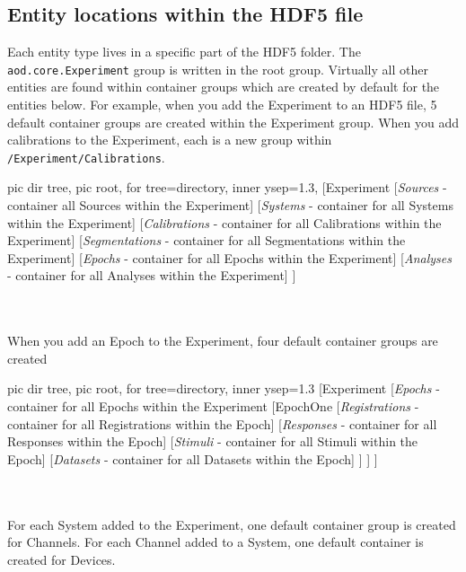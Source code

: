 \documentclass[10pt]{exam}
\newcommand\aodclass[1]{\textcolor{codeblue}{\texttt{#1}}}
\begin{document}
	\subsection{Entity locations within the HDF5 file}
		\label{subsection:EntityLocationsInHDF5}
		\noindent Each entity type lives in a specific part of the HDF5 folder. The \aodclass{aod.core.Experiment} group is written in the root group. Virtually all other entities are found within container groups which are created by default for the entities below. For example, when you add the Experiment to an HDF5 file, 5 default container groups are created within the Experiment group. When you add calibrations to the Experiment, each is a new group within \texttt{/Experiment/Calibrations}. \\
		
		\begin{forest}
			pic dir tree,
			pic root,
			for tree={directory, inner ysep=1.3},
			[Experiment
				[\textit{Sources} - container all Sources within the Experiment]
				[\textit{Systems} - container for all Systems within the Experiment]
				[\textit{Calibrations} - container for all Calibrations within the Experiment]
				[\textit{Segmentations} - container for all Segmentations within the Experiment]
				[\textit{Epochs} - container for all Epochs within the Experiment]
				[\textit{Analyses} - container for all Analyses within the Experiment]
			]
		\end{forest}
		\\$\quad$\\
		\noindent When you add an Epoch to the Experiment, four default container groups are created
		
		\begin{forest}
			pic dir tree, 
			pic root,
			for tree={directory, inner ysep=1.3}
			[Experiment
				[\textit{Epochs} - container for all Epochs within the Experiment
					[EpochOne
						[\textit{Registrations} - container for all Registrations within the Epoch]
						[\textit{Responses} - container for all Responses within the Epoch]
						[\textit{Stimuli} - container for all Stimuli within the Epoch]
						[\textit{Datasets} - container for all Datasets within the Epoch]
					]
				]
			]
		\end{forest}
		\\$\quad$\\
		For each System added to the Experiment, one default container group is created for Channels. For each Channel added to a System, one default container is created for Devices.
				
\end{document}
